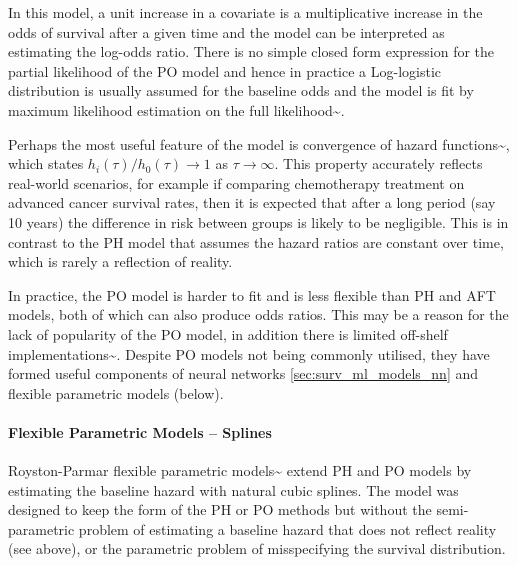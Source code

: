 \documentclass[
  letterpaper,
]{scrbook}
\let\oldparagraph\paragraph
\renewcommand{\paragraph}[1]{\oldparagraph{#1}\mbox{}}
\theoremstyle{plain}
\theoremstyle{definition}
\theoremstyle{remark}
\begin{document}
In this model, a unit increase in a covariate is a multiplicative
increase in the odds of survival after a given time and the model can be
interpreted as estimating the log-odds ratio. There is no simple closed
form expression for the partial likelihood of the PO model and hence in
practice a Log-logistic distribution is usually assumed for the baseline
odds and the model is fit by maximum likelihood estimation on the full
likelihood\textasciitilde{}\cite{Bennett1983}.

Perhaps the most useful feature of the model is convergence of hazard
functions\textasciitilde{}\cite{Kirmani2001}, which states
\(h_i(\tau)/h_0(\tau) \rightarrow 1\) as \(\tau \rightarrow \infty\).
This property accurately reflects real-world scenarios, for example if
comparing chemotherapy treatment on advanced cancer survival rates, then
it is expected that after a long period (say 10 years) the difference in
risk between groups is likely to be negligible. This is in contrast to
the PH model that assumes the hazard ratios are constant over time,
which is rarely a reflection of reality.

In practice, the PO model is harder to fit and is less flexible than PH
and AFT models, both of which can also produce odds ratios. This may be
a reason for the lack of popularity of the PO model, in addition there
is limited off-shelf implementations\textasciitilde{}\cite{Collett2014}.
Despite PO models not being commonly utilised, they have formed useful
components of neural networks \ref{sec:surv_ml_models_nn} and flexible
parametric models (below).

\paragraph{Flexible Parametric Models -- Splines}

Royston-Parmar flexible parametric
models\textasciitilde{}\cite{RoystonParmar2002} extend PH and PO models
by estimating the baseline hazard with natural cubic splines. The model
was designed to keep the form of the PH or PO methods but without the
semi-parametric problem of estimating a baseline hazard that does not
reflect reality (see above), or the parametric problem of misspecifying
the survival distribution.
\end{document}
